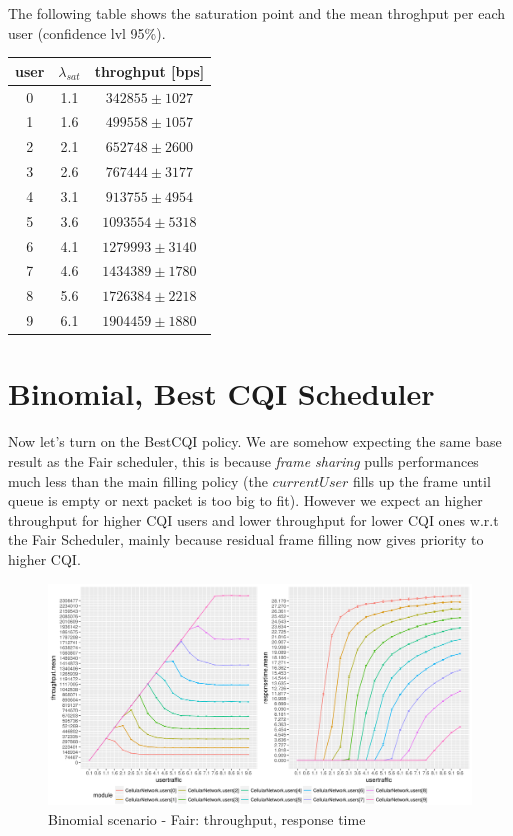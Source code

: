 The following table shows the saturation point and the mean throghput per each user (confidence lvl 95\%).
\begin{center}
	\begin{tabular}{|c | c | c|}
	\hline
	 \textbf{user}  & \textbf{\(\lambda_{sat}\)}  & \textbf{throghput [bps]} \\ \hline
	 0 & 1.1 & $342855 \pm 1027$ \\ \hline
	 1 & 1.6 & $499558 \pm 1057$\\ \hline
	 2 & 2.1 & $652748 \pm 2600$\\ \hline
	 3 & 2.6 & $767444 \pm 3177$\\ \hline
	 4 & 3.1 & $913755 \pm 4954$\\ \hline
	 5 & 3.6 & $1093554 \pm 5318$\\ \hline
	 6 & 4.1 & $1279993 \pm 3140$\\ \hline
	 7 & 4.6 & $1434389 \pm 1780$ \\ \hline
	 8 & 5.6 & $1726384 \pm 2218$ \\ \hline
	 9 & 6.1 & $1904459 \pm 1880$ \\ \hline
	\end{tabular}
\end{center}

\section{Binomial, Best CQI Scheduler}
Now let's turn on the BestCQI policy. We are somehow expecting the same base result as the Fair scheduler, this is because \textit{frame sharing} pulls performances much less than the main filling policy (the \(currentUser\) fills up the frame until queue is empty or next packet is too big to fit). However we expect an higher throughput for higher CQI users and lower throughput for lower CQI ones w.r.t the Fair Scheduler, mainly because residual frame filling now gives priority to higher CQI.

\begin{figure}[H]
  \includegraphics[width=1\textwidth]{images/all-binombest.png}
  \caption{Binomial scenario - Fair: throughput, response time}
  \label{fig:all-binombest}
\end{figure}

